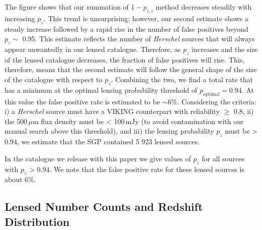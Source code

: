 \documentclass[fleqn,usenatbib]{mnras}
\begin{document}
The figure shows that our summation of $1 - p_{z,i}$ method decreases steadily with increasing $p_z$. This trend is unsurprising; however, our second estimate shows a steady increase followed by a rapid rise in the number of false positives beyond $p_z \sim$ 0.95. This estimate reflects the number of \textit{Herschel} sources that will always appear unwantedly in our lensed catalogue. Therefore, as $p_z$ increases and the size of the lensed catalogue decreases, the fraction of false positives will rise. This, therefore, means that the second estimate will follow the general shape of the size of the catalogue with respect to $p_z$. Combining the two, we find a total rate that has a minimum at the optimal lensing probability threshold of $p_{\textrm{optimal}} = 0.94$. At this value the false positive rate is estimated to be $\sim 6\%$. Considering the criteria: i) a \textit{Herschel} source must have a VIKING counterpart with reliability $\geq$ 0.8, ii) the 500\,$\mu$m flux density must be < 100\,mJy (to avoid contamination with our manual search above this threshold), and iii) the lensing probability $p_z$ must be > 0.94, we estimate that the SGP contained 5 923 lensed sources.

In the catalogue we release with this paper we give values of $p_z$ for all sources with $p_z$ > 0.94. We note that the false positive rate for these lensed sources is about 6\%.

\subsection{Lensed Number Counts and Redshift Distribution}
\label{sec:lensed_number_counts}
\end{document}
